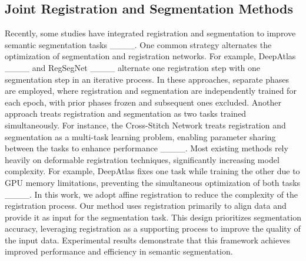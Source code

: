 \subsection{Joint Registration and Segmentation Methods}
Recently, some studies have integrated registration and segmentation to improve semantic segmentation tasks ____. One common strategy alternates the optimization of segmentation and registration networks. For example, DeepAtlas ____ and RegSegNet ____ alternate one registration step with one segmentation step in an iterative process. In these approaches, separate phases are employed, where registration and segmentation are independently trained for each epoch, with prior phases frozen and subsequent ones excluded.
Another approach treats registration and segmentation as two tasks trained simultaneously. For instance, the Cross-Stitch Network treats registration and segmentation as a multi-task learning problem, enabling parameter sharing between the tasks to enhance performance ____. Most existing methods rely heavily on deformable registration techniques, significantly increasing model complexity. For example, DeepAtlas fixes one task while training the other due to GPU memory limitations, preventing the simultaneous optimization of both tasks ____.
In this work, we adopt affine registration to reduce the complexity of the registration process. Our method uses registration primarily to align data and provide it as input for the segmentation task. This design prioritizes segmentation accuracy, leveraging registration as a supporting process to improve the quality of the input data. Experimental results demonstrate that this framework achieves improved performance and efficiency in semantic segmentation.